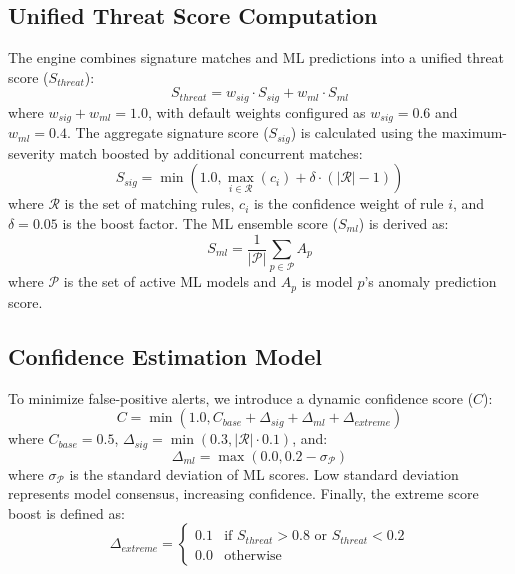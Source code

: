 \documentclass[journal]{IEEEtran}
\begin{document}
\subsection{Unified Threat Score Computation}
The engine combines signature matches and ML predictions into a unified threat score ($S_{threat}$):
\begin{equation}
S_{threat} = w_{sig} \cdot S_{sig} + w_{ml} \cdot S_{ml}
\end{equation}
where $w_{sig} + w_{ml} = 1.0$, with default weights configured as $w_{sig} = 0.6$ and $w_{ml} = 0.4$. The aggregate signature score ($S_{sig}$) is calculated using the maximum-severity match boosted by additional concurrent matches:
\begin{equation}
S_{sig} = \min\left(1.0, \max_{i \in \mathcal{R}}(c_i) + \delta \cdot (|\mathcal{R}| - 1)\right)
\end{equation}
where $\mathcal{R}$ is the set of matching rules, $c_i$ is the confidence weight of rule $i$, and $\delta = 0.05$ is the boost factor. The ML ensemble score ($S_{ml}$) is derived as:
\begin{equation}
S_{ml} = \frac{1}{|\mathcal{P}|}\sum_{p \in \mathcal{P}} A_p
\end{equation}
where $\mathcal{P}$ is the set of active ML models and $A_p$ is model $p$'s anomaly prediction score.

\subsection{Confidence Estimation Model}
To minimize false-positive alerts, we introduce a dynamic confidence score ($C$):
\begin{equation}
C = \min\left(1.0, C_{base} + \Delta_{sig} + \Delta_{ml} + \Delta_{extreme}\right)
\end{equation}
where $C_{base} = 0.5$, $\Delta_{sig} = \min(0.3, |\mathcal{R}| \cdot 0.1)$, and:
\begin{equation}
\Delta_{ml} = \max(0.0, 0.2 - \sigma_{\mathcal{P}})
\end{equation}
where $\sigma_{\mathcal{P}}$ is the standard deviation of ML scores. Low standard deviation represents model consensus, increasing confidence. Finally, the extreme score boost is defined as:
\begin{equation}
\Delta_{extreme} = \begin{cases} 0.1 & \text{if } S_{threat} > 0.8 \text{ or } S_{threat} < 0.2 \\ 0.0 & \text{otherwise} \end{cases}
\end{equation}
\end{document}
